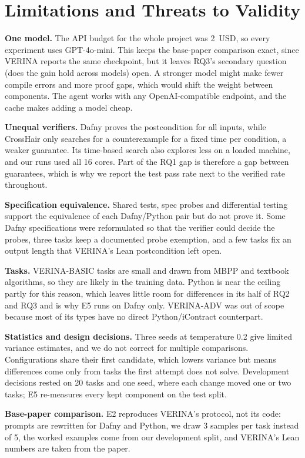 \section{Limitations and Threats to Validity}
\label{sec:limits}

\textbf{One model.} The API budget for the whole project was 2~USD, so every experiment uses GPT-4o-mini. This keeps the base-paper comparison exact, since VERINA reports the same checkpoint, but it leaves RQ3's secondary question (does the gain hold across models) open. A stronger model might make fewer compile errors and more proof gaps, which would shift the weight between components. The agent works with any OpenAI-compatible endpoint, and the cache makes adding a model cheap.

\textbf{Unequal verifiers.} Dafny proves the postcondition for all inputs, while CrossHair only searches for a counterexample for a fixed time per condition, a weaker guarantee. Its time-based search also explores less on a loaded machine, and our runs used all 16 cores. Part of the RQ1 gap is therefore a gap between guarantees, which is why we report the test pass rate next to the verified rate throughout.

\textbf{Specification equivalence.} Shared tests, spec probes and differential testing support the equivalence of each Dafny/Python pair but do not prove it. Some Dafny specifications were reformulated so that the verifier could decide the probes, three tasks keep a documented probe exemption, and a few tasks fix an output length that VERINA's Lean postcondition left open.

\textbf{Tasks.} VERINA-BASIC tasks are small and drawn from MBPP and textbook algorithms, so they are likely in the training data. Python is near the ceiling partly for this reason, which leaves little room for differences in its half of RQ2 and RQ3 and is why E5 runs on Dafny only. VERINA-ADV was out of scope because most of its types have no direct Python/iContract counterpart.

\textbf{Statistics and design decisions.} Three seeds at temperature 0.2 give limited variance estimates, and we do not correct for multiple comparisons. Configurations share their first candidate, which lowers variance but means differences come only from tasks the first attempt does not solve. Development decisions rested on 20 tasks and one seed, where each change moved one or two tasks; E5 re-measures every kept component on the test split.

\textbf{Base-paper comparison.} E2 reproduces VERINA's protocol, not its code: prompts are rewritten for Dafny and Python, we draw 3 samples per task instead of 5, the worked examples come from our development split, and VERINA's Lean numbers are taken from the paper.
